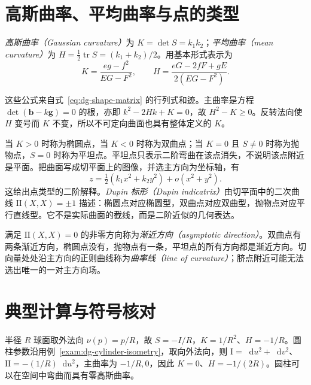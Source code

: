 \documentclass[UTF8,12pt,a4paper,fontset=fandol]{ctexbook}
\newcommand{\dd}{\mathop{}\!\mathrm d}
\DeclareMathOperator{\tr}{tr}
\begin{document}
\section{高斯曲率、平均曲率与点的类型}
\begin{definition}[高斯曲率与平均曲率]
\emph{高斯曲率（Gaussian curvature）}为 $K=\det S=k_1k_2$；\emph{平均曲率（mean curvature）}为 $H=\tfrac12\tr S=(k_1+k_2)/2$。用基本形式表示为
\begin{equation}
 K=\frac{eg-f^2}{EG-F^2},\qquad
 H=\frac{eG-2fF+gE}{2(EG-F^2)}.
 \label{eq:dg-KH}
\end{equation}
\end{definition}
这些公式来自式~\eqref{eq:dg-shape-matrix} 的行列式和迹。主曲率是方程 $\det(\mathbf b-k\mathbf g)=0$ 的根，亦即 $k^2-2Hk+K=0$，故 $H^2-K\ge0$。反转法向使 $H$ 变号而 $K$ 不变，所以不可定向曲面也具有整体定义的 $K$。

当 $K>0$ 时称为椭圆点，当 $K<0$ 时称为双曲点；当 $K=0$ 且 $S\ne0$ 时称为抛物点，$S=0$ 时称为平坦点。平坦点只表示二阶弯曲在该点消失，不说明该点附近是平面。把曲面写成切平面上的图像，并选主方向为坐标轴，有
\[
 z=\tfrac12(k_1x^2+k_2y^2)+o(x^2+y^2).
\]
这给出点类型的二阶解释。\emph{Dupin 标形（Dupin indicatrix）}由切平面中的二次曲线 $\mathrm{II}(X,X)=\pm1$ 描述：椭圆点对应椭圆型，双曲点对应双曲型，抛物点对应平行直线型。它不是实际曲面的截线，而是二阶近似的几何表达。

满足 $\mathrm{II}(X,X)=0$ 的非零方向称为\emph{渐近方向（asymptotic direction）}。双曲点有两条渐近方向，椭圆点没有，抛物点有一条，平坦点的所有方向都是渐近方向。切向量处处沿主方向的正则曲线称为\emph{曲率线（line of curvature）}；脐点附近可能无法选出唯一的一对主方向场。

\section{典型计算与符号核对}
\begin{example}[球面与圆柱]
半径 $R$ 球面取外法向 $\nu(p)=p/R$，故 $S=-I/R$，$K=1/R^2$、$H=-1/R$。圆柱参数沿用例~\ref{exam:dg-cylinder-isometry}，取向外法向，则 $\mathrm I=\dd u^2+\dd v^2$、$\mathrm{II}=-(1/R)\dd u^2$，主曲率为 $-1/R,0$，因此 $K=0$、$H=-1/(2R)$。圆柱可以在空间中弯曲而具有零高斯曲率。
\end{example}
\end{document}
